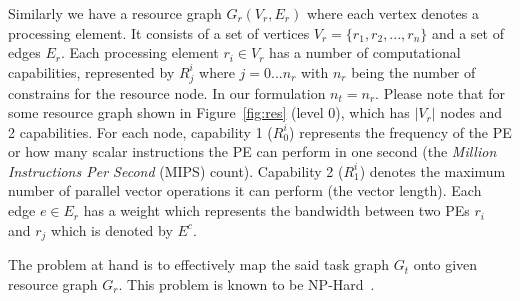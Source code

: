 \documentclass[10pt, conference, compsocconf]{IEEEtran}
\begin{document}

Similarly we have a resource graph $G_r(V_r, E_r)$ where each vertex
denotes a processing element. It consists of a set of vertices $V_r =
\{r_1, r_2, ... , r_n\}$ and a set of edges $E_r$. Each processing
element $r_i \in V_r$ has a number of computational capabilities,
represented by $R^{i}_{j}$ where $j=0...n_r$ with $n_r$ being the number
of constrains for the resource node. In our formulation $n_t = n_r$.
Please note that for some resource graph shown in Figure~\ref{fig:res}
(level 0), which has $|V_r|$ nodes and 2 capabilities. For each node,
capability 1 ($R^i_0$) represents the frequency of the PE or how many
scalar instructions the PE can perform in one second (the
\textit{Million Instructions Per Second} (MIPS) count). Capability 2
($R^i_1$) denotes the maximum number of parallel vector operations it
can perform (the vector length). Each edge $e \in E_r$ has a weight
which represents the bandwidth between two PEs $r_i$ and $r_j$ which is
denoted by $E^c$.


The problem at hand is to effectively map the said task graph $G_t$ onto
given resource graph $G_r$. This problem is known to be
NP-Hard~\cite{vsar89}. %
\end{document}
